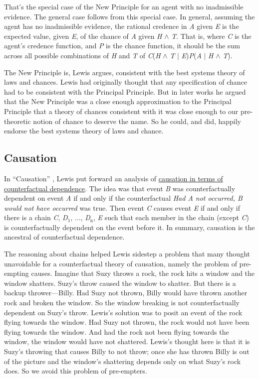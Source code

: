 That's the special case of the New Principle for an agent with no inadmissible evidence. The general case follows from this special case. In general, assuming the agent has no inadmissible evidence, the rational credence in \textit{A} given \textit{E} is the expected value, given \textit{E}, of the chance of \textit{A} given \textit{H} \(\wedge\) \textit{T}. That is, where \textit{C} is the agent's credence function, and \textit{P} is the chance function, it should be the sum across all possible combinations of \textit{H} and \textit{T} of \textit{C}(\textit{H} \(\wedge\) \textit{T} \(|\) \textit{E})\textit{P}(\textit{A} \(|\) \textit{H} \(\wedge\) \textit{T}).

The New Principle is, Lewis argues, consistent with the best systems theory of laws and chances. Lewis had originally thought that any specification of chance had to be consistent with the Principal Principle. But in later works he argued that the New Principle was a close enough approximation to the Principal Principle that a theory of chances consistent with it was close enough to our pre-theoretic notion of chance to deserve the name. So he could, and did, happily endorse the best systems theory of laws and chance.

\subsection{Causation} 
In ``Causation'' \citeyearpar{Lewis1973b}, Lewis put forward an analysis of \href{http://plato.stanford.edu/causation-counterfactual/}{causation in terms of counterfactual dependence}. The idea was that event \textit{B} was counterfactually dependent on event \textit{A} if and only if the counterfactual \textit{Had A not occurred, B would not have occurred} was true. Then event \textit{C} causes event \textit{E} if and only if there is a chain \textit{C}, \textit{D}\(_\text{1}\), ..., \textit{D}\(_\text{n}\), \textit{E} such that each member in the chain (except \textit{C}) is counterfactually dependent on the event before it. In summary, causation is the ancestral of counterfactual dependence.

The reasoning about chains helped Lewis sidestep a problem that many thought unavoidable for a counterfactual theory of causation, namely the problem of pre-empting causes. Imagine that Suzy throws a rock, the rock hits a window and the window shatters. Suzy's throw caused the window to shatter. But there is a backup thrower---Billy. Had Suzy not thrown, Billy would have thrown another rock and broken the window. So the window breaking is not counterfactually dependent on Suzy's throw. Lewis's solution was to posit an event of the rock flying towards the window. Had Suzy not thrown, the rock would not have been flying towards the window. And had the rock not been flying towards the window, the window would have not shattered. Lewis's thought here is that it is Suzy's throwing that causes Billy to not throw; once she has thrown Billy is out of the picture and the window's shattering depends only on what Suzy's rock does. So we avoid this problem of pre-empters.

